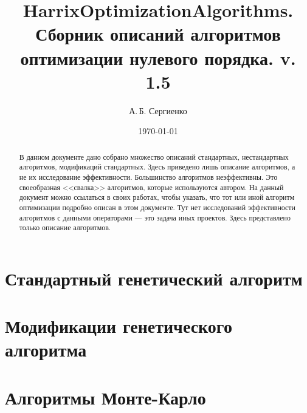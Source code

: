 \documentclass[a4paper,12pt]{article}
\title{HarrixOptimizationAlgorithms. Сборник описаний алгоритмов оптимизации нулевого порядка. v. 1.5}
\author{А.\,Б. Сергиенко}
\date{\today}
\begin{document}


\maketitle

\begin{abstract}
В данном документе дано собрано множество описаний стандартных, нестандартных алгоритмов, модификаций стандартных. Здесь приведено лишь описание алгоритмов, а не их исследование эффективности. Большинство алгоритмов неэффективны. Это своеобразная <<свалка>>  алгоритмов, которые используются автором. На данный документ можно ссылаться в своих работах, чтобы указать, что тот или иной алгоритм оптимизации подробно описан в этом документе. Тут нет исследований эффективности алгоритмов с данными операторами --- это задача иных проектов. Здесь представлено только описание алгоритмов.
\end{abstract}

\tableofcontents

\newpage









\section{Стандартный генетический алгоритм}\label{HarrixOptimizationAlgorithms:GA}




\section{Модификации генетического алгоритма}\label{HarrixOptimizationAlgorithms:ModGA}










\section{Алгоритмы Монте-Карло}\label{HarrixOptimizationAlgorithms:MonteCarlo}




\newpage
\end{document}
